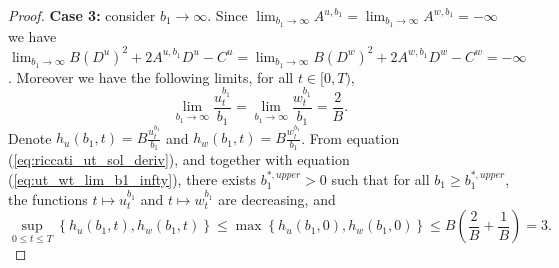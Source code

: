 \documentclass[11pt]{article}
\begin{document}
\begin{proof}
	
	\textbf{Case 3:} consider $b_1 \to \infty$. Since $\lim_{b_1 \to \infty} A^{u,b_1} = \lim_{b_1 \to \infty} A^{w,b_1} = - \infty$ we have 
	$\lim_{b_1 \to \infty}B (D^{u})^2 + 2 A^{u,b_1} D^{u} - C^{u} = \lim_{b_1 \to \infty}B (D^{w})^2 + 2 A^{w,b_1} D^{w} - C^{w}=-\infty$. Moreover we have the following limits, for all $t \in [0,T)$,
	\begin{equation}
		\lim_{b_1 \to \infty} \frac{u_t^{b_1}}{b_1} =  	\lim_{b_1 \to \infty} \frac{w_t^{b_1}}{b_1} = \frac{2}{B}.
	\label{eq:ut_wt_lim_b1_infty}
	\end{equation}
	Denote $h_u(b_1,t) = B \frac{u_t^{b_1}}{b_1}$ and $h_w(b_1,t) = B \frac{w_t^{b_1}}{b_1}$. From equation (\ref{eq:riccati_ut_sol_deriv}), and together with equation (\ref{eq:ut_wt_lim_b1_infty}), there exists $b_1^{*,upper} >0$ such that for all $b_1 \geq b_1^{*,upper}$, the functions $t \mapsto u_t^{b_1}$ and $t \mapsto w_t^{b_1}$ are decreasing, and
	$$ \sup_{0 \leq t \leq T} \left\{ h_u(b_1, t), h_w(b_1,t)\right\} \leq \max \left\{ h_u(b_1, 0), h_w(b_1,0) \right\} \leq B \left(\frac{2}{B} +\frac{1}{B} \right) = 3.$$
	

\end{proof}
\end{document}
